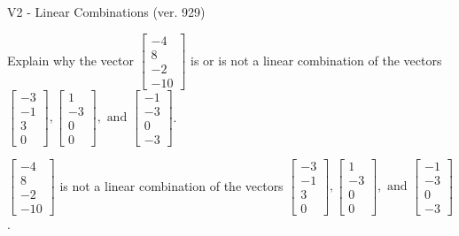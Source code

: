 \begin{exercise}
  \begin{exerciseTitle}V2 - Linear Combinations (ver. 929)\end{exerciseTitle}
  \begin{exerciseStatement}
    Explain why the vector \(\left[\begin{array}{c}
-4 \\
8 \\
-2 \\
-10
\end{array}\right]\)  is or is not a linear 
	combination of the vectors \(\left[\begin{array}{c}
-3 \\
-1 \\
3 \\
0
\end{array}\right] , \left[\begin{array}{c}
1 \\
-3 \\
0 \\
0
\end{array}\right] , \text{ and } \left[\begin{array}{c}
-1 \\
-3 \\
0 \\
-3
\end{array}\right]\).
	


  \end{exerciseStatement}
  \begin{exerciseAnswer}
   \(\left[\begin{array}{c}
-4 \\
8 \\
-2 \\
-10
\end{array}\right]\) 
  	 is not  
	a linear combination of the vectors \(\left[\begin{array}{c}
-3 \\
-1 \\
3 \\
0
\end{array}\right] , \left[\begin{array}{c}
1 \\
-3 \\
0 \\
0
\end{array}\right] , \text{ and } \left[\begin{array}{c}
-1 \\
-3 \\
0 \\
-3
\end{array}\right]\).

	
  


  \end{exerciseAnswer}
\end{exercise}